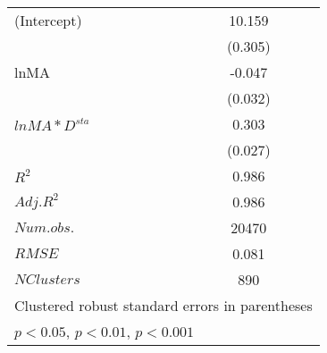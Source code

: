 \begin{table}[H]
\begin{minipage}[t]{0.45\columnwidth}
\begin{center}
{\begin{tabular}{l*{4}{c}}
\hline
(Intercept)    &       &      &       10.159\sym{***}&       \\
               &       &      &        (0.305)       &        \\
[1em]
 lnMA            &      &       &      -0.047\sym{} &          \\
               &      &       &     (0.032)         &           \\
[1em]
\(lnMA*D^{sta}\)     &      &      &      0.303\sym{***} &          \\
               &      &       &     (0.027)         &           \\
[1em]
\hline
\(R^{2}\)      &      &       &        0.986        &          \\
\(Adj.R^{2}\)  &      &       &       0.986         &         \\
\(Num.obs.\)   &      &       &    20470            &          \\
\(RMSE\)       &      &       &    0.081            &          \\
\(N Clusters\) &      &       &    890              &          \\
\hline\hline
\multicolumn{5}{l}{\footnotesize Clustered robust standard errors in parentheses}\\
\multicolumn{5}{l}{\footnotesize \sym{*} \(p<0.05\), \sym{**} \(p<0.01\), \sym{***} \(p<0.001\)}\\
\end{tabular}
}
  \end{center}
  \end{minipage}
  \end{table}
  


